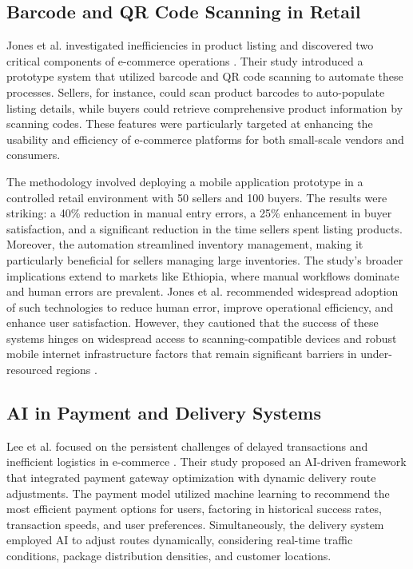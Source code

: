 \documentclass[12pt]{report}
\begin{document}
\subsection*{Barcode and QR Code Scanning in Retail}

Jones et al. investigated inefficiencies in product listing and discovered two critical
components of e-commerce operations \cite{c17}. Their study introduced a prototype system that
utilized barcode and QR code scanning to automate these processes. Sellers, for instance,
could scan product barcodes to auto-populate listing details, while buyers could retrieve
comprehensive product information by scanning codes. These features were particularly
targeted at enhancing the usability and efficiency of e-commerce platforms for both
small-scale vendors and consumers.

The methodology involved deploying a mobile application prototype in a controlled retail
environment with 50 sellers and 100 buyers. The results were striking: a 40\% reduction in
manual entry errors, a 25\% enhancement in buyer satisfaction, and a significant reduction in
the time sellers spent listing products. Moreover, the automation streamlined inventory
management, making it particularly beneficial for sellers managing large inventories. The
study’s broader implications extend to markets like Ethiopia, where manual workflows
dominate and human errors are prevalent. Jones et al. recommended widespread adoption of
such technologies to reduce human error, improve operational efficiency, and enhance user
satisfaction. However, they cautioned that the success of these systems hinges on widespread
access to scanning-compatible devices and robust mobile internet infrastructure factors that
remain significant barriers in under-resourced regions \cite{c17}.

\subsection*{AI in Payment and Delivery Systems}

Lee et al. focused on the persistent challenges of delayed transactions and inefficient logistics
in e-commerce \cite{c18}. Their study proposed an AI-driven framework that integrated payment
gateway optimization with dynamic delivery route adjustments. The payment model utilized
machine learning to recommend the most efficient payment options for users, factoring in
historical success rates, transaction speeds, and user preferences. Simultaneously, the delivery
system employed AI to adjust routes dynamically, considering real-time traffic conditions,
package distribution densities, and customer locations.
\end{document}
